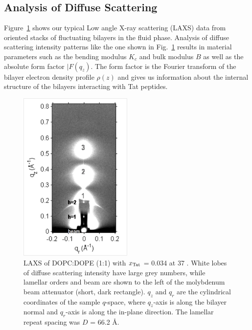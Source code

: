 \subsection{Analysis of Diffuse Scattering}\label{sec:diffuse_analysis}
Figure~\ref{fig:figure1} shows our typical Low angle X-ray scattering (LAXS) data 
from oriented stacks of fluctuating bilayers in the fluid phase. Analysis of diffuse scattering 
intensity patterns like the one shown in Fig.~\ref{fig:figure1} results in material 
parameters such as the bending modulus $K_c$ and bulk modulus $B$ as well as
the absolute form factor $|F(q_z)$. 
The form factor is the Fourier transform of the bilayer electron 
density profile $\rho(z)$ and gives us information about the internal structure of the
bilayers interacting with Tat peptides.

\begin{figure}[htbp]
  \centering
  \includegraphics[width=0.5\textwidth]{figures/Tat/figure1}
  \caption{LAXS of DOPC:DOPE (1:1) with $x_\textrm{Tat}$ = 0.034 at 37 \textcelsius. 
  White lobes of diffuse scattering intensity have large grey numbers, while
  lamellar orders and beam are shown to the left of the
  molybdenum beam attenuator (short, dark rectangle). $q_z$ and $q_r$ are the 
  cylindrical coordinates of the sample $q$-space, where $q_z$-axis is along 
  the bilayer normal and $q_r$-axis is along the in-plane direction. 
  The lamellar repeat spacing was $D$ = 66.2 \AA.}
  \label{fig:figure1}
\end{figure}

